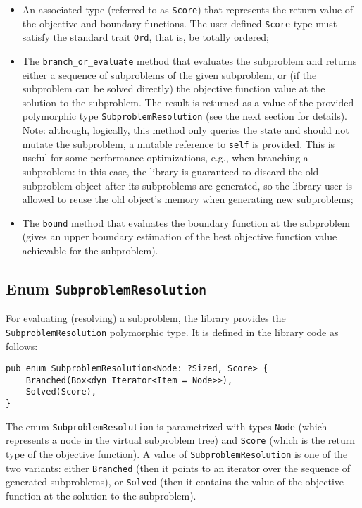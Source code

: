 \begin{itemize}
 \item An associated type (referred to as \texttt{Score}) that represents the return value of
    the objective and boundary functions. The user-defined \texttt{Score} type must satisfy
    the standard trait \texttt{Ord}, that is, be totally ordered;

 \item The \texttt{branch\_or\_evaluate} method that evaluates the subproblem and returns
    either a sequence of subproblems of the given subproblem, or (if the subproblem can be
    solved directly) the objective function value at the solution to the subproblem. The result
    is returned as a value of the provided polymorphic type \texttt{SubproblemResolution}
    (see the next section for details). \\
    Note: although, logically, this method only queries the state and should not mutate the
    subproblem, a mutable reference to \texttt{self} is provided. This is useful for some
    performance optimizations, e.g., when branching a subproblem: in this case, the library
    is guaranteed to discard the old subproblem object after its subproblems are generated,
    so the library user is allowed to reuse the old object's memory when generating new
    subproblems;

 \item The \texttt{bound} method that evaluates the boundary function at the subproblem
    (gives an upper boundary estimation of the best objective function value achievable for
    the subproblem).
\end{itemize}

\subsection{Enum \texttt{SubproblemResolution}}

\sloppy
For evaluating (resolving) a subproblem, the library provides the \texttt{SubproblemResolution}
polymorphic type. It is defined in the library code as follows:

\begin{lstlisting}[caption=Enum \texttt{SubproblemResolution},label={lst:SubproblemResolution}]
pub enum SubproblemResolution<Node: ?Sized, Score> {
    Branched(Box<dyn Iterator<Item = Node>>),
    Solved(Score),
}
\end{lstlisting}

The enum \texttt{SubproblemResolution} is parametrized with types \texttt{Node}
(which represents a node in the virtual subproblem tree) and \texttt{Score}
(which is the return type of the objective function).
A value of \texttt{SubproblemResolution} is one of the two variants: either \texttt{Branched}
(then it points to an iterator over the sequence of generated subproblems), or \texttt{Solved}
(then it contains the value of the objective function at the solution to the subproblem).

